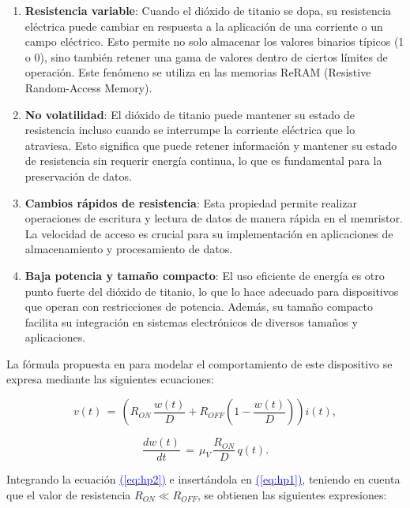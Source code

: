 \documentclass[12pt,a4paper]{report} %
\newcommand{\eref}[1]{\hyperref[#1]{\textcolor{blue}{(\ref*{#1})}}}
\newcommand{\eref}[1]{\hyperref[#1]{\textcolor{blue}{\textit{(\ref*{#1})}}}}
\begin{document}
	\vspace{0.5cm}
	
	\begin{enumerate}
		\item \textbf{Resistencia variable}: Cuando el dióxido de titanio se dopa, su resistencia eléctrica puede cambiar en respuesta a la aplicación de una corriente o un campo eléctrico. Esto permite no solo almacenar los valores binarios típicos (1 o 0), sino también retener una gama de valores dentro de ciertos límites de operación. Este fenómeno se utiliza en las memorias ReRAM (Resistive Random-Access Memory).
		\item \textbf{No volatilidad}: El dióxido de titanio puede mantener su estado de resistencia incluso cuando se interrumpe la corriente eléctrica que lo atraviesa. Esto significa que puede retener información y mantener su estado de resistencia sin requerir energía continua, lo que es fundamental para la preservación de datos.
		\item \textbf{Cambios rápidos de resistencia}: Esta propiedad permite realizar operaciones de escritura y lectura de datos de manera rápida en el memristor. La velocidad de acceso es crucial para su implementación en aplicaciones de almacenamiento y procesamiento de datos.
		\item \textbf{Baja potencia y tamaño compacto}: El uso eficiente de energía es otro punto fuerte del dióxido de titanio, lo que lo hace adecuado para dispositivos que operan con restricciones de potencia. Además, su tamaño compacto facilita su integración en sistemas electrónicos de diversos tamaños y aplicaciones.
	\end{enumerate}
	
	\newpage
	
	La fórmula propuesta en \cite{HP} para modelar el comportamiento de este dispositivo se expresa mediante las siguientes ecuaciones:
	
	\begin{equation}
		v(t)\,=\,\left(R_{ON}\,\frac{w(t)}{D}+R_{OFF}\left(1-\frac{w(t)}{D}\right)\right)i(t),
		\label{eq:hp1}
	\end{equation}\smallskip
	
	\begin{equation}
		\frac{dw(t)}{dt}\,=\,\mu_V\,\frac{R_{ON}}{D}\,q(t).
		\label{eq:hp2}
	\end{equation}\smallskip
	
	\noindent Integrando la ecuación \eref{eq:hp2} e insertándola en \eref{eq:hp1}, teniendo en cuenta que el valor de resistencia $R_{ON} \ll R_{OFF}$, se obtienen las siguientes expresiones:
	
\end{document}
